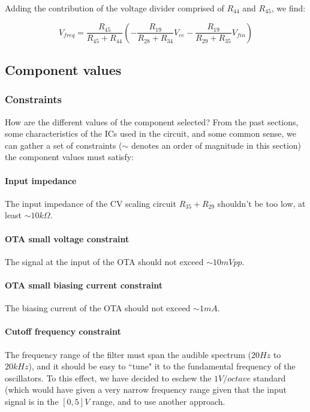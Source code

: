 \documentclass[a4paper,11pt]{article}
\begin{document}
Adding the contribution of the voltage divider comprised of $R_{44}$ and $R_{45}$, we find:

\begin{equation}
V_{freq} = \frac{R_{45}}{R_{45} + R_{44}} \left(-\frac{R_{19}}{R_{28} + R_{34}} V_{ee} -\frac{R_{19}}{R_{29} + R_{35}} V_{fin}\right)
\end{equation}

\subsection{Component values}

\subsubsection{Constraints}

How are the different values of the component selected? From the past sections, some characteristics of the ICs used in the circuit, and some common sense, we can gather a set of constraints ($\sim$ denotes an order of magnitude in this section) the component values must satisfy:

\paragraph{Input impedance} The input impedance of the CV scaling circuit $R_{35} + R_{29}$ shouldn't be too low, at least $\sim 10k \Omega$.

\paragraph{OTA small voltage constraint} The signal at the input of the OTA should not exceed $\sim 10mV pp$.

\paragraph{OTA small biasing current constraint} The biasing current of the OTA should not exceed $\sim 1mA$.

\paragraph{Cutoff frequency constraint} The frequency range of the filter must span the audible spectrum ($20 Hz$ to $20kHz$), and it should be easy to ``tune" it to the fundamental frequency of the oscillators. To this effect, we have decided to eschew the $1 V/octave$ standard (which would have given a very narrow frequency range given that the input signal is in the $[0, 5]V$ range, and to use another approach.
\end{document}
